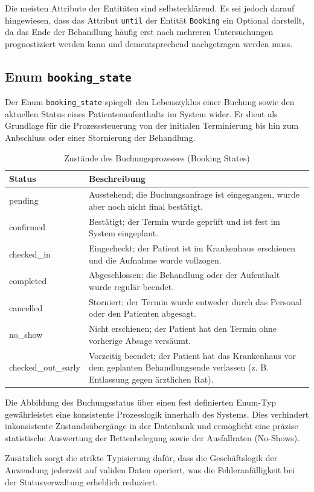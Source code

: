 Die meisten Attribute der Entitäten sind selbsterklärend. 
Es sei jedoch darauf hingewiesen, dass das Attribut \texttt{until} der Entität \texttt{Booking} ein Optional darstellt, da das Ende der Behandlung häufig erst nach mehreren Untersuchungen prognostiziert werden kann und dementsprechend nachgetragen werden muss.

\newpage

\subsection*{Enum \texttt{booking\_state}}
Der Enum \texttt{booking\_state} spiegelt den Lebenszyklus einer Buchung sowie den aktuellen Status eines Patientenaufenthalts im System wider.
Er dient als Grundlage für die Prozesssteuerung von der initialen Terminierung bis hin zum Anbschluss oder einer Stornierung der Behandlung.

\begin{table}[h]
\centering
\renewcommand{\arraystretch}{1.4}
\begin{tabularx}{\textwidth}{|l|X|}
\hline
\textbf{Status} & \textbf{Beschreibung} \\
\hline
pending & Ausstehend; die Buchungsanfrage ist eingegangen, wurde aber noch nicht final bestätigt. \\
\hline
confirmed & Bestätigt; der Termin wurde geprüft und ist fest im System eingeplant. \\
\hline
checked\_in & Eingecheckt; der Patient ist im Krankenhaus erschienen und die Aufnahme wurde vollzogen. \\
\hline
completed & Abgeschlossen; die Behandlung oder der Aufenthalt wurde regulär beendet. \\
\hline
cancelled & Storniert; der Termin wurde entweder durch das Personal oder den Patienten abgesagt. \\
\hline
no\_show & Nicht erschienen; der Patient hat den Termin ohne vorherige Absage versäumt. \\
\hline
checked\_out\_early & Vorzeitig beendet; der Patient hat das Krankenhaus vor dem geplanten Behandlungsende verlassen (z. B. Entlassung gegen ärztlichen Rat). \\
\hline
\end{tabularx}
\caption{Zustände des Buchungsprozesses (Booking States)}
\end{table}

Die Abbildung des Buchungsstatus über einen fest definierten Enum-Typ gewährleistet eine konsistente Prozesslogik innerhalb des Systems. Dies verhindert inkonsistente Zustandsübergänge in der Datenbank und ermöglicht eine präzise statistische Auswertung der Bettenbelegung sowie der Ausfallraten (No-Shows).

Zusätzlich sorgt die strikte Typisierung dafür, dass die Geschäftslogik der Anwendung jederzeit auf validen Daten operiert, was die Fehleranfälligkeit bei der Statusverwaltung erheblich reduziert.

